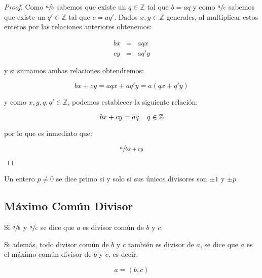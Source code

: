         \begin{proof}
            Como $\sfrac{a}{b}$ sabemos que existe un $q \in \mathbb{Z}$ tal que $b = aq$ y como $\sfrac{a}{c}$ sabemos que existe un $q' \in \mathbb{Z}$ tal que $c = aq'$.
            Dados $x, y \in \mathbb{Z}$ generales, al multiplicar estos enteros por las relaciones anteriores obtenemos:

            \begin{eqnarray*}
                bx & = & aqx \\
                cy & = & aq'y
            \end{eqnarray*}

            y si sumamos ambas relaciones obtendremos:

            \begin{equation*}
                bx + cy = aqx + aq'y = a(qx + q'y)
            \end{equation*}

            y como $x, y, q, q' \in \mathbb{Z}$, podemos establecer la siguiente relación:

            \begin{equation*}
                bx + cy = a \bar{q} \quad \mkern2mu \bar{q} \in \mathbb{Z}
            \end{equation*}

            por lo que es inmediato que:

            \begin{equation*}
                \sfrac{a}{bx + cy}
            \end{equation*}
        \end{proof}

        \begin{definicion}
            Un entero $p \ne 0$ se dice primo si y solo si sus únicos divisores son $\pm 1$ y $\pm p$
        \end{definicion}


    \subsection{Máximo Común Divisor}

        \begin{definicion}
            Si $\sfrac{a}{b}$ y $\sfrac{a}{c}$ se dice que $a$ es divisor común de $b$ y $c$.

            Si además, todo divisor común de $b$ y $c$ también es divisor de $a$, se dice que $a$ es el máximo común divisor de $b$ y $c$, es decir:

            \begin{equation}
                a = (b, c)
            \end{equation}
        \end{definicion}

